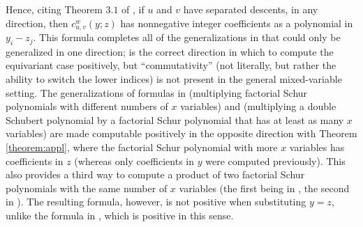 \documentclass[reqno]{amsart}
\theoremstyle{definition}
\theoremstyle{remark}
\numberwithin{equation}{subsection}
\begin{document}
Hence, citing Theorem $3.1$ of \cite{samuelmolev}, if $u$ and $v$ have separated descents, in any direction, then $c_{u,v}^w(y;z)$ has nonnegative integer coefficients as a polynomial in $y_i-z_j$.
%
This formula completes all of the generalizations in \cite{samuelmolev} that could only be generalized in one direction; \cite{samuelmolev} is the correct direction in which to compute the equivariant case positively, but ``commutativity'' (not literally, but rather the ability to switch the lower indices) is not present in the general mixed-variable setting. The generalizations of formulas in \cite{grass} (multiplying factorial Schur polynomials with different numbers of $x$ variables) and \cite{kohnert1997multiplication} (multiplying a double Schubert polynomial by a factorial Schur polynomial that has at least as many $x$ variables) are made computable positively in the opposite direction with Theorem \ref{theorem:appl}, where the factorial Schur polynomial with more $x$ variables has coefficients in $z$ (whereas only coefficients in $y$ were computed previously). This also provides a third way to compute a product of two factorial Schur polynomials with the same number of $x$ variables (the first being in \cite{molev1999littlewood}, the second in \cite{samuelmolev}). The resulting formula, however, is not positive when substituting $y=z$, unlike the formula in \cite{samuelmolev}, which is positive in this sense.
%
\end{document}

